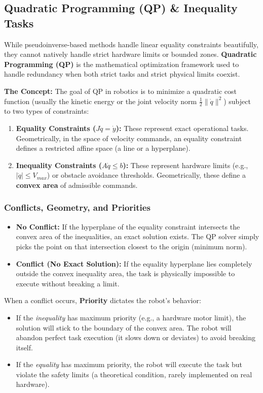 \documentclass[11pt,a4paper]{article}
\begin{document}
\subsection{Quadratic Programming (QP) \& Inequality Tasks}
While pseudoinverse-based methods handle linear equality constraints beautifully, they cannot natively handle strict hardware limits or bounded zones. \textbf{Quadratic Programming (QP)} is the mathematical optimization framework used to handle redundancy when both strict tasks and strict physical limits coexist.

\textbf{The Concept:} The goal of QP in robotics is to minimize a quadratic cost function (usually the kinetic energy or the joint velocity norm $\frac{1}{2}\|\dot{q}\|^2$) subject to two types of constraints:
\begin{enumerate}
    \item \textbf{Equality Constraints ($J\dot{q} = \dot{y}$):} These represent exact operational tasks. Geometrically, in the space of velocity commands, an equality constraint defines a restricted affine space (a line or a hyperplane).
    \item \textbf{Inequality Constraints ($A\dot{q} \le b$):} These represent hardware limits (e.g., $|\dot{q}| \le V_{max}$) or obstacle avoidance thresholds. Geometrically, these define a \textbf{convex area} of admissible commands.
\end{enumerate}

\subsubsection{Conflicts, Geometry, and Priorities}
\begin{itemize}
    \item \textbf{No Conflict:} If the hyperplane of the equality constraint intersects the convex area of the inequalities, an exact solution exists. The QP solver simply picks the point on that intersection closest to the origin (minimum norm).
    \item \textbf{Conflict (No Exact Solution):} If the equality hyperplane lies completely outside the convex inequality area, the task is physically impossible to execute without breaking a limit. 
\end{itemize}

When a conflict occurs, \textbf{Priority} dictates the robot's behavior:
\begin{itemize}
    \item If the \textit{inequality} has maximum priority (e.g., a hardware motor limit), the solution will stick to the boundary of the convex area. The robot will abandon perfect task execution (it slows down or deviates) to avoid breaking itself.
    \item If the \textit{equality} has maximum priority, the robot will execute the task but violate the safety limits (a theoretical condition, rarely implemented on real hardware).
\end{itemize}
\end{document}
